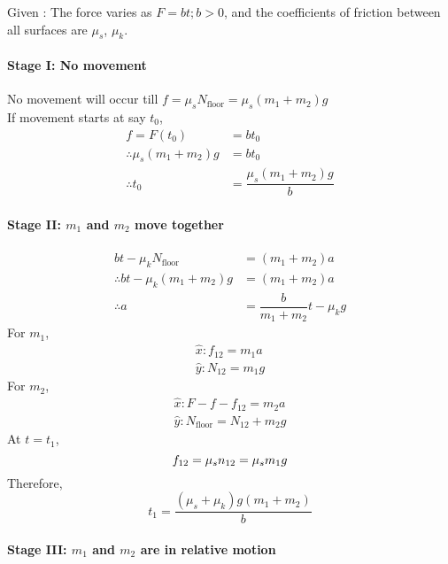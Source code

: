\documentclass[fleqn]{article}
\begin{document}
Given : The force varies as $F = bt ; b>0$, and the coefficients of friction between all surfaces are $\mu_s$, $\mu_k$.

\paragraph*{Stage I: No movement\\}
No movement will occur till $f = \mu_s N_\text{floor} = \mu_s (m_1 + m_2) g$\\
If movement starts at say $t_0$, 
\begin{align*}
	f = F(t_0) &= b t_0\\
	\therefore \mu_s (m_1 + m_2) g &= b t_0\\
	\therefore t_0 &= \dfrac{\mu_s (m_1 + m_2) g}{b}
\end{align*}

\paragraph*{Stage II: $m_1$ and $m_2$ move together\\}

\begin{align*}
	b t - \mu_k N_{\text{floor}} &= (m_1 + m_2) a\\
	\therefore bt - \mu_k (m_1 + m_2) g &= (m_1 + m_2) a\\
	\therefore a &= \dfrac{b}{m_1 + m_2} t - \mu_k g
\end{align*}
For $m_1$,
\begin{align*}
	\hat{x} : f_{12} = m_1 a\\
	\hat{y} : N_{12} = m_1 g
\end{align*}
For $m_2$,
\begin{align*}
	\hat{x} : F - f - f_{12} = m_2 a\\
	\hat{y} : N_{\text{floor}} = N_{12} + m_2 g
\end{align*}
At $t = t_1$,
\begin{equation*}
	f_{12} = \mu_s n_{12} = \mu_s m_1 g\\
\end{equation*}
Therefore,
\begin{equation*}
	t_1 = \dfrac{(\mu_s + \mu_k) g (m_1 + m_2)}{b}
\end{equation*}

\paragraph*{Stage III: $m_1$ and $m_2$ are in relative motion\\}
\end{document}
